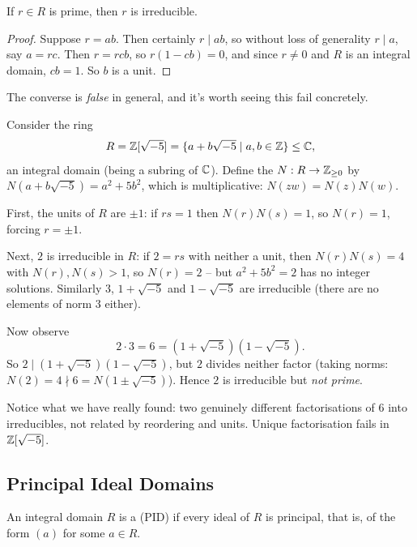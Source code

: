 \documentclass[a4paper]{scrartcl}
\begin{document}
\begin{lemma}
	If $r \in R$ is prime, then $r$ is irreducible.
\end{lemma}
\begin{proof}
	Suppose $r = ab$. Then certainly $r \mid ab$, so without loss of generality $r \mid a$, say $a = rc$. Then $r = rcb$, so $r(1 - cb) = 0$, and since $r \neq 0$ and $R$ is an integral domain, $cb = 1$. So $b$ is a unit.
\end{proof}

The converse is \emph{false} in general, and it's worth seeing this fail concretely.

\begin{example}
	Consider the ring
	$$
	R = \mathbb{Z}[\sqrt{-5}] = \{a + b\sqrt{-5} \mid a, b \in \mathbb{Z}\} \leq \mathbb{C},
	$$
	an integral domain (being a subring of $\mathbb{C}$). Define the  $N: R \rightarrow \mathbb{Z}_{\geq 0}$ by $N(a + b \sqrt{-5}) = a^2 + 5b^2$, which is multiplicative: $N(zw) = N(z)N(w)$.

	First, the units of $R$ are $\pm 1$: if $rs = 1$ then $N(r)N(s) = 1$, so $N(r) = 1$, forcing $r = \pm 1$.

	Next, $2$ is irreducible in $R$: if $2 = rs$ with neither a unit, then $N(r)N(s) = 4$ with $N(r), N(s) > 1$, so $N(r) = 2$ -- but $a^2 + 5b^2 = 2$ has no integer solutions. Similarly $3$, $1 + \sqrt{-5}$ and $1 - \sqrt{-5}$ are irreducible (there are no elements of norm $3$ either).

	Now observe
	$$
	2 \cdot 3 = 6 = (1 + \sqrt{-5})(1 - \sqrt{-5}).
	$$
	So $2 \mid (1 + \sqrt{-5})(1 - \sqrt{-5})$, but $2$ divides neither factor (taking norms: $N(2) = 4 \nmid 6 = N(1 \pm \sqrt{-5})$). Hence $2$ is irreducible but \emph{not prime}.

	Notice what we have really found: two genuinely different factorisations of $6$ into irreducibles, not related by reordering and units. Unique factorisation fails in $\mathbb{Z}[\sqrt{-5}]$.
\end{example}

\subsection{Principal Ideal Domains}

\begin{definition}
	An integral domain $R$ is a  (PID) if every ideal of $R$ is principal, that is, of the form $(a)$ for some $a \in R$.
\end{definition}
\end{document}
